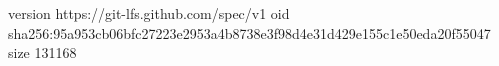 version https://git-lfs.github.com/spec/v1
oid sha256:95a953cb06bfc27223e2953a4b8738e3f98d4e31d429e155c1e50eda20f55047
size 131168
